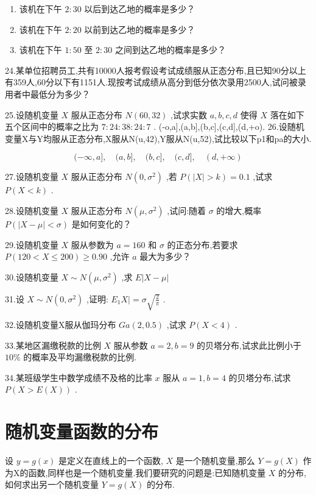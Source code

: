 \begin{enumerate}
	\item 该机在下午 $ 2:30 $ 以后到达乙地的概率是多少？
	\item 该机在下午 $ 2:20 $ 以前到达乙地的概率是多少？
	\item 该机在下午 $ 1:50 $ 至 $ 2:30 $ 之间到达乙地的概率是多少？
\end{enumerate}

24.某单位招聘员工,共有10000人报考假设考试成绩服从正态分布,且已知90分以上有359人,60分以下有1151人.现按考试成绩从高分到低分依次录用2500人,试问被录用者中最低分为多少？

25.设随机变量 $ X $ 服从正态分布 $ N(60,32) $ ,试求实数 $ a,b,c,d $ 使得 $ X $ 落在如下五个区间中的概率之比为 $ 7:24:38:24:7 $ .
(-o,a],(a,b],(b,c],(c,d],(d,+o).
26.设随机变量X与Y均服从正态分布,X服从N(u,42),Y服从N(u,52),试比较以下p1和pa的大小.

\[
(-\infty, a], \quad(a, b], \quad(b, c], \quad(c, d], \quad(d,+\infty)
\]

27.设随机变量 $ X $ 服从正态分布 $ N\left(0, \sigma^{2}\right) $ ,若 $ P(|X|>k)=0.1 $ ,试求 $ P(X<k) $ .

28.设随机变量 $ X $ 服从正态分布 $ N\left(\mu, \sigma^{2}\right) $ ,试问:随着 $ \sigma $ 的增大,概率 $ P(|X-\mu|<\sigma) $ 是如何变化的？

29.设随机变量 $ X $ 服从参数为 $ a=160 $ 和 $ \sigma $ 的正态分布,若要求 $ P(120<X \leqslant 200) \geqslant 0.90 $ ,允许 $ a $ 最大为多少？

30.设随机变量 $ X \sim N\left(\mu, \sigma^{2}\right) $ ,求 $ E | X-\mu | $ 

31.设 $ X \sim N\left(0, \sigma^{2}\right) $ ,证明: $ E_{1} X |=\sigma \sqrt{\frac{2}{\pi}} $ .

32.设随机变量X服从伽玛分布 $ G a(2,0.5) $ ,试求 $ P(X<4) $ .

33.某地区漏缴税款的比例 $ X $ 服从参数 $ a=2,b=9 $ 的贝塔分布,试求此比例小于 $ 10\% $ 的概率及平均漏缴税款的比例.

34.某班级学生中数学成绩不及格的比率 $ x $ 服从 $ a=1,b=4 $ 的贝塔分布,试求 $ P(X>E(X)) $ .

\section{随机变量函数的分布}

设 $ y=g(x) $ 是定义在直线上的一个函数, $ X $ 是一个随机变量,那么 $ Y=g(X) $ 作为X的函数,同样也是一个随机变量.我们要研究的问题是:已知随机变量 $ X $ 的分布,如何求出另一个随机变量 $ Y=g(X) $ 的分布.

